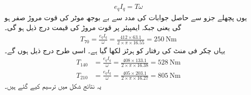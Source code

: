\begin{itemize}
\begin{align}
e_q I_q=T \omega
\end{align}
یوں پچھلے جزو سے حاصل جوابات کی مدد سے بے بوجھ موٹر کی قوت مروڑ  صفر ہو گی یعنی   جبکہ   ایمپیئر پر قوت مروڑ کی قیمت درج ذیل ہو گی۔
\begin{align*}
T_{70}=\frac{e_q I_q}{\omega}=\frac{412 \times 63.1}{2 \times \pi \times 16.55}=\SI{250}{\newton \meter}
\end{align*}
یہاں  چکر فی منٹ کی رفتار کو  ہرٹز لکھا گیا ہے۔ اسی طرح درج ذیل ہوں گے۔
\begin{align*}
T_{140}&=\frac{e_q I_q}{\omega}=\frac{408 \times 133.1}{2 \times \pi \times 16.38}=\SI{528}{\newton \meter}\\
T_{210}&=\frac{e_q I_q}{\omega}=\frac{405 \times  203.1}{2 \times \pi \times 16.27}=\SI{805}{\newton \meter}
\end{align*}
یہ نتائج شکل   میں ترسیم کیے گئے ہیں۔
\end{itemize}
